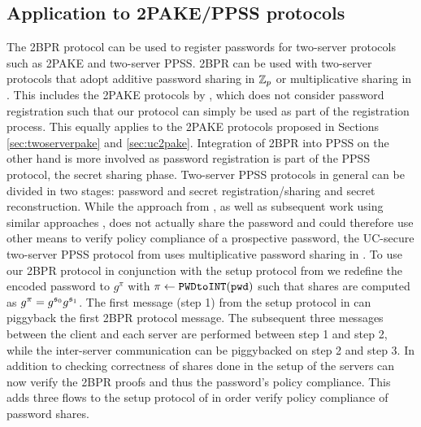 \subsection{Application to 2PAKE/PPSS protocols}
The \ac{2BPR} protocol can be used to register passwords for two-server protocols such as \ac{2PAKE} and two-server \ac{PPSS}.
\ac{2BPR} can be used with two-server protocols that adopt additive password sharing in $\mathbb{Z}_p$ or multiplicative sharing in \GG.
This includes the \ac{2PAKE} protocols by \citet{Katz2012a}, which does not consider password registration such that our protocol can simply be used as part of the registration process.
This equally applies to the \ac{2PAKE} protocols proposed in Sections \ref{sec:twoserverpake} and \ref{sec:uc2pake}.
Integration of \ac{2BPR} into \ac{PPSS} on the other hand is more involved as password registration is part of the \ac{PPSS} protocol, \ie the secret sharing phase.
Two-server \ac{PPSS} protocols in general can be divided in two stages: password and secret registration/sharing and secret reconstruction.
While the approach from \citet{Bagherzandi2011}, as well as subsequent work using similar approaches \cite{PryvalovK14,CamenischLLN14,JareckiKK14}, does not actually share the password and could therefore use other means to verify policy compliance of a prospective password, the \ac{UC}-secure two-server \ac{PPSS} protocol from \citet{Camenisch2012} uses multiplicative password sharing in \GG.
To use our \ac{2BPR} protocol in conjunction with the setup protocol from \citet{Camenisch2012} we redefine the encoded password to $g^{\pi}$ with $\pi\gets\texttt{PWDtoINT}(\mathtt{pwd})$ such that shares are computed as $g^{\pi}=g^{\mathfrak{s}_0}g^{\mathfrak{s}_1}$.
The first message (step 1) from the setup protocol in \cite{Camenisch2012} can piggyback the first \ac{2BPR} protocol message.
The subsequent three messages between the client and each server are performed between step 1 and step 2, while the inter-server communication can be piggybacked on step 2 and step 3.
In addition to checking correctness of shares done in the setup of \cite{Camenisch2012} the servers can now verify the \ac{2BPR} proofs and thus the password's policy compliance.
This adds three flows to the setup protocol of \cite{Camenisch2012} in order verify policy compliance of password shares.
